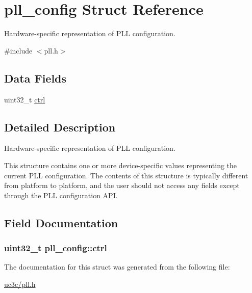 \hypertarget{structpll__config}{
\section{pll\-\_\-config \-Struct \-Reference}
\label{structpll__config}
}


\-Hardware-\/specific representation of \-P\-L\-L configuration.  




{\ttfamily \#include $<$pll.\-h$>$}

\subsection*{\-Data \-Fields}
\begin{DoxyCompactItemize}
\item 
uint32\-\_\-t \hyperlink{structpll__config_a34089a7ab6c1536ae2e8d6d8e2929ac5}{ctrl}
\end{DoxyCompactItemize}


\subsection{\-Detailed \-Description}
\-Hardware-\/specific representation of \-P\-L\-L configuration. 

\-This structure contains one or more device-\/specific values representing the current \-P\-L\-L configuration. \-The contents of this structure is typically different from platform to platform, and the user should not access any fields except through the \-P\-L\-L configuration \-A\-P\-I. 

\subsection{\-Field \-Documentation}
\hypertarget{structpll__config_a34089a7ab6c1536ae2e8d6d8e2929ac5}{
\subsubsection[{ctrl}]{\setlength{\rightskip}{0pt plus 5cm}uint32\-\_\-t {\bf pll\-\_\-config\-::ctrl}}}
\label{structpll__config_a34089a7ab6c1536ae2e8d6d8e2929ac5}


\-The documentation for this struct was generated from the following file\-:\begin{DoxyCompactItemize}
\item 
\hyperlink{uc3c_2pll_8h}{uc3c/pll.\-h}\end{DoxyCompactItemize}
